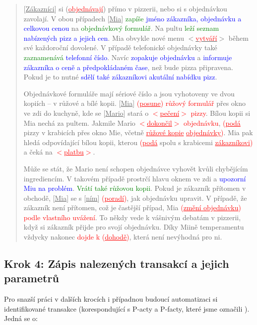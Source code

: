 \documentclass[]{article}
\begin{document}
\begin{quote}
[\underline{Zákazníci}] si (\underline{\textcolor{red}{objednávají}}) přímo v pizzerii, nebo si s objednávkou zavolají. V obou případech [\underline{Mia}] \textcolor{green}{zapíše} \textcolor{blue}{jméno zákazníka, objednávku a celkovou cenou} na \textcolor{green}{objednávkový formulář}. Na pultu \textcolor{green}{leží seznam} \textcolor{blue}{nabízených pizz a jejich cen}. Mia obvykle nové menu $<$\underline{\textcolor{red}{vytváří}}$>$ během své každoroční dovolené. V případě telefonické objednávky také \textcolor{green}{zaznamenává} \textcolor{blue}{telefonní číslo}. Navíc \textcolor{blue}{zopakuje objednávku} a \textcolor{blue}{informuje zákazníka o ceně a předpokládaném čase}, než bude pizza připravena. Pokud je to nutné \textcolor{blue}{sdělí také zákazníkovi akutální nabídku pizz}. 

Objednávkové formuláře mají sériové číslo a jsou vyhotoveny ve dvou kopiích – v růžové a bílé kopii. [\underline{Mia}] \textcolor{red}{(\underline{posune}) růžový formulář} přes okno ve zdi do kuchyně, kde se [\underline{Mario}] stará o \textcolor{red}{$<$\underline{pečení}$>$ pizzy}. Bílou kopii si Mia nechá za pultem. Jakmile Mario \textcolor{red}{$<$\underline{dokončil}$>$ objednávku}, \textcolor{red}{(\underline{podá}} pizzy v krabicích přes okno Mie, včetně \textcolor{red}{\underline{růžové kopie} \underline{objednávky})}. Mia pak hledá odpovídající bílou kopii, kterou \textcolor{red}{(\underline{podá}} spolu s krabicemi \textcolor{red}{\underline{zákazníkovi})} a čeká na \textcolor{red}{$<$\underline{platbu}$>$}. 

Může se stát, že Mario není schopen objednávce vyhovět kvůli chybějícím ingrediencím. V takovém případě prostrčí hlavu oknem ve zdi a \textcolor{blue}{upozorní Miu na problém}. \textcolor{green}{Vrátí také růžovou kopii}. Pokud je zákazník přítomen v obchodě, [\underline{Mia}] se s [\underline{ním}] \textcolor{red}{(\underline{poradí})}, jak objednávku upravit. V případě, že zákazník není přítomen, což je častější případ, Mia \textcolor{red}{(\underline{změní objednávku}) podle vlastního uvážení}. To někdy vede k vášnivým debatám v pizzerii, když si zákazník přijde pro svojí objednávku. Díky Miině temperamentu vždycky nakonec \textcolor{red}{dojde k (\underline{dohodě})}, která není nevýhodná pro ni.
\end{quote}

\subsection{Krok 4: Zápis nalezených transakcí a jejich parametrů}
Pro snazší práci v dalších krocích i případnou budoucí automatizaci si identifikované transakce (korespondující s P-acty a P-facty, které jsme označili ). Jedná se o:
\end{document}
